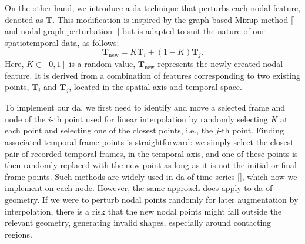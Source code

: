 \documentclass[12pt,a4paper]{report}
\begin{document}
On the other hand, we introduce a \ac{da} technique that perturbs each nodal feature, denoted as $\mathbf{T}$. This modification is inspired by the graph-based Mixup method [\cite{guo2023,park2022}] and nodal graph perturbation [\cite{gibson2022}] but is adapted to suit the nature of our spatiotemporal data, as follows:
%
\begin{equation}\label{eq-interpolation}
    \mathbf{T}_{\text{new}} = K \mathbf{T}_i + (1 - K)\mathbf{T}_j.
\end{equation}
%
Here, $K \in [0, 1]$ is a random value, $\mathbf{T}_{\text{new}}$ represents the newly created nodal feature. It is derived from a combination of features corresponding to two existing points, $\mathbf{T}_i$ and $\mathbf{T}_j$, located in the spatial axis and temporal space.

To implement our \ac{da}, we first need to identify and move a selected frame and node of the $i$-th point used for linear interpolation by randomly selecting $K$ at each point and selecting one of the closest points, i.e., the $j$-th point. Finding associated temporal frame points is straightforward: we simply select the closest pair of recorded temporal frames, in the temporal axis, and one of these points is then randomly replaced with the new point as long as it is not the initial or final frame points. Such methods are widely used in \ac{da} of time series [\cite{oh2020}], which now we implement on each node. However, the same approach does apply to \ac{da} of geometry. If we were to perturb nodal points randomly for later augmentation by interpolation, there is a risk that the new nodal points might fall outside the relevant geometry, generating invalid shapes, especially around contacting regions.
\end{document}
